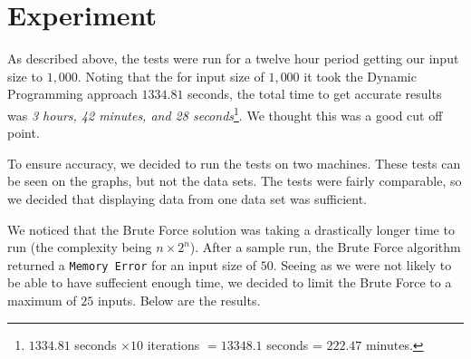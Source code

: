 \documentclass{article}
\begin{document}
\section{Experiment}
As described above, the tests were run for a twelve hour period getting our input size to $1,000$. Noting that the for input size of $1,000$ it took the Dynamic Programming approach $1334.81$ seconds, the total time to get accurate results was \textit{3 hours, 42 minutes, and 28 seconds}\footnote{$1334.81$ seconds $\times 10$ iterations $= 13348.1$ seconds = $222.47$ minutes.}. We thought this was a good cut off point.

To ensure accuracy, we decided to run the tests on two machines. These tests can be seen on the graphs, but not the data sets. The tests were fairly comparable, so we decided that displaying data from one data set was sufficient.

We noticed that the Brute Force solution was taking a drastically longer time to run (the complexity being $n \times 2^n$). After a sample run, the Brute Force algorithm returned a \texttt{Memory Error} for an input size of $50$. Seeing as we were not likely to be able to have suffecient enough time, we decided to limit the Brute Force to a maximum of $25$ inputs. Below are the results.
\end{document}
